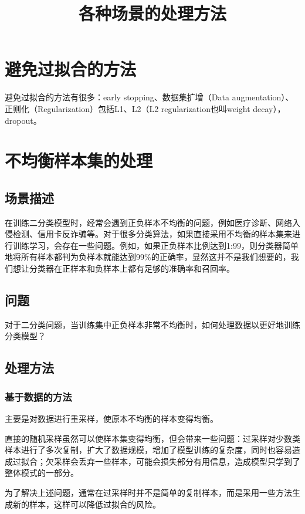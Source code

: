 \documentclass[12pt]{article}
\title{各种场景的处理方法}
\begin{document}
\maketitle
\tableofcontents

\section{避免过拟合的方法}
避免过拟合的方法有很多：early stopping、数据集扩增（Data augmentation）、正则化（Regularization）包括L1、L2（L2 regularization也叫weight decay），dropout。

\section{不均衡样本集的处理\cite{Handle_Unbalanced_Samples}}
\subsection{场景描述}
在训练二分类模型时，经常会遇到正负样本不均衡的问题，例如医疗诊断、网络入侵检测、信用卡反诈骗等。对于很多分类算法，如果直接采用不均衡的样本集来进行训练学习，会存在一些问题。例如，如果正负样本比例达到1:99，则分类器简单地将所有样本都判为负样本就能达到99\%的正确率，显然这并不是我们想要的，我们想让分类器在正样本和负样本上都有足够的准确率和召回率。

\subsection{问题}
对于二分类问题，当训练集中正负样本非常不均衡时，如何处理数据以更好地训练分类模型？ 

\subsection{处理方法}
\subsubsection{基于数据的方法}
主要是对数据进行重采样，使原本不均衡的样本变得均衡。

直接的随机采样虽然可以使样本集变得均衡，但会带来一些问题：过采样对少数类样本进行了多次复制，扩大了数据规模，增加了模型训练的复杂度，同时也容易造成过拟合；欠采样会丢弃一些样本，可能会损失部分有用信息，造成模型只学到了整体模式的一部分。

为了解决上述问题，通常在过采样时并不是简单的复制样本，而是采用一些方法生成新的样本，这样可以降低过拟合的风险。
\end{document}
